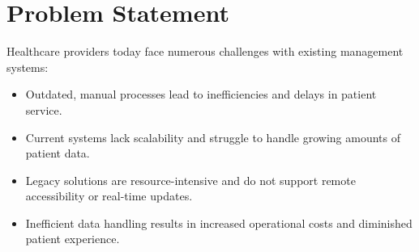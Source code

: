 \section{Problem Statement}
Healthcare providers today face numerous challenges with existing management systems:
\begin{itemize}
    \item Outdated, manual processes lead to inefficiencies and delays in patient service.
    \item Current systems lack scalability and struggle to handle growing amounts of patient data.
    \item Legacy solutions are resource-intensive and do not support remote accessibility or real-time updates.
    \item Inefficient data handling results in increased operational costs and diminished patient experience.
\end{itemize}
